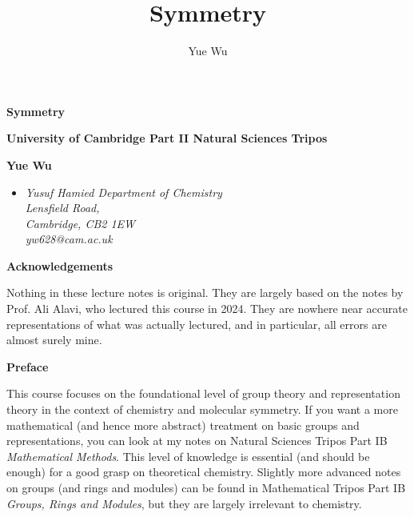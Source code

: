 \documentclass{article}
\title{Symmetry}
\author{Yue Wu}
\theoremstyle{plain}\theoremheaderfont{\normalfont\itshape}\theorembodyfont{\rmfamily}\theoremseparator{.}\newtheorem*{rem}{Remark}\newtheorem*{ex}{Example}\newtheorem*{proof}{Proof}\newtheorem*{altp}{Alternative proof}
\theoremstyle{plain}\theoremheaderfont{\normalfont\bfseries}\theorembodyfont{\rmfamily}\theoremseparator{.}\newtheorem{thm}{Theorem}[section]\newtheorem{lem}[thm]{Lemma}\newtheorem{prop}[thm]{Proposition}\newtheorem*{cor}{Corollary}\newtheorem{defn}[thm]{Definition}\newtheorem{clm}[thm]{Claim}\newtheorem{clminproof}{Claim}\newtheorem*{law}{Law}\newtheorem{pos}[thm]{Postulate}
\theoremstyle{break}\theoremheaderfont{\normalfont\itshape}\theorembodyfont{\rmfamily}\theoremseparator{.\medskip}\newtheorem*{proofskip}{Proof}\newtheorem*{exs}{Examples}\newtheorem*{rems}{Remarks}
\theoremstyle{break}\theoremheaderfont{\normalfont\bfseries}\theorembodyfont{\rmfamily}\theoremseparator{.\medskip}\newtheorem{lemskip}[thm]{Lemma}\newtheorem{defnskip}[thm]{Definition}\newtheorem{propskip}[thm]{Proposition}\newtheorem{thmskip}[thm]{Theorem}
\numberwithin{equation}{section}
\begin{document}
    \setlength{\parindent}{0pt}
	\Huge\textsf{\textbf{Symmetry}}
		
	\Large\textsf{\textbf{University of Cambridge Part II Natural Sciences Tripos}}

	\noindent\makebox[\linewidth]{\rule{\textwidth}{2pt}}

	\large\textsf{\textbf{Yue Wu}}
	\begin{itemize}[topsep=0pt,leftmargin=15pt]
		\item[] \textit{Yusuf Hamied Department of Chemistry\\
		Lensfield Road,\\
		Cambridge, CB2 1EW}\\

		\textit{yw628@cam.ac.uk}
	\end{itemize}
    \thispagestyle{empty}
    \setlength{\parindent}{15pt}

    \newpage
    \begin{center}
		\textbf{\Large{Acknowledgements}}
	\end{center}
	\large
	Nothing in these lecture notes is original. They are largely based on the notes by Prof. Ali Alavi, who lectured this course in 2024. They are nowhere near accurate representations of what was actually lectured, and in particular, all errors are almost surely mine.

    \vskip 30pt

    \begin{center}
		\textbf{\Large{Preface}}
	\end{center}
	\large
    This course focuses on the foundational level of group theory and representation theory in the context of chemistry and molecular symmetry. If you want a more mathematical (and hence more abstract) treatment on basic groups and representations, you can look at my notes on Natural Sciences Tripos Part IB \textit{Mathematical Methods}. This level of knowledge is essential (and should be enough) for a good grasp on theoretical chemistry. Slightly more advanced notes on groups (and rings and modules) can be found in Mathematical Tripos Part IB \textit{Groups, Rings and Modules}, but they are largely irrelevant to chemistry.

    \normalsize
    \newpage
	\tableofcontents
	\newpage
\end{document}
